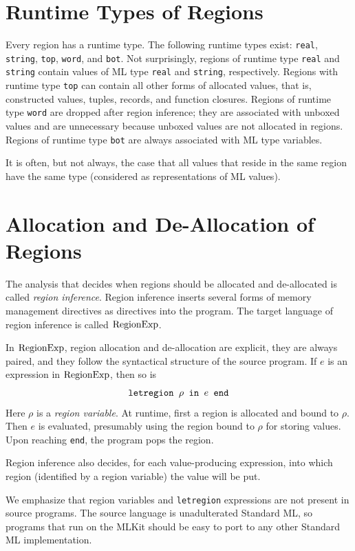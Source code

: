 \documentclass[12pt]{book}
\begin{document}
\section{Runtime Types of Regions}
\label{runtimetypes.sec}
Every region has a 
%
runtime type. The following runtime types exist: {\tt real}, {\tt
  string}, {\tt top}, {\tt word}, and {\tt bot}. Not surprisingly,
regions of runtime type {\tt real} and {\tt string} contain values of
ML type {\tt real} and {\tt string}, respectively.  Regions with
runtime type {\tt top} can contain all other forms of allocated
values, that is, constructed values, tuples, records, and function
closures. Regions of runtime type {\tt word} are dropped after region
inference; they are associated with unboxed values and are unnecessary
because unboxed values are not allocated in regions. Regions of
runtime type {\tt bot} are always associated with ML type variables.

It is often, but not always, the case that all values that reside in
the same region have the same type (considered as representations of
ML values).
 
\section{Allocation and De-Allocation of Regions}
\label{aldeal.sec}
The analysis that decides when regions should be allocated and
de-allocated is called {\em region inference}. Region inference
inserts several forms of memory management directives as directives
into the program.  The target language of region inference is called
%
$\hbox{\rm RegionExp}$.

In $\hbox{\rm RegionExp}$, region allocation and de-allocation are explicit, they
are always paired, and they follow the syntactical structure of the
source program.  If $e$ is an expression in $\hbox{\rm RegionExp}$, then so is
%
$$\hbox{\tt letregion $\rho$ in $e$ end}$$
Here $\rho$ is a 
%
{\em region variable}. At runtime, first a region is allocated and
bound to $\rho$. Then $e$ is evaluated, presumably using the region
bound to $\rho$ for storing values. Upon reaching {\tt end}, the
program pops the region.

Region inference also decides, for each value-producing expression,
into which region (identified by a region variable) the value will be
put.

We emphasize that region variables and {\tt letregion} expressions are
not present in source programs. The source language is unadulterated
Standard ML, so programs that run on the MLKit should be easy to port to
any other Standard ML implementation.
\end{document}
